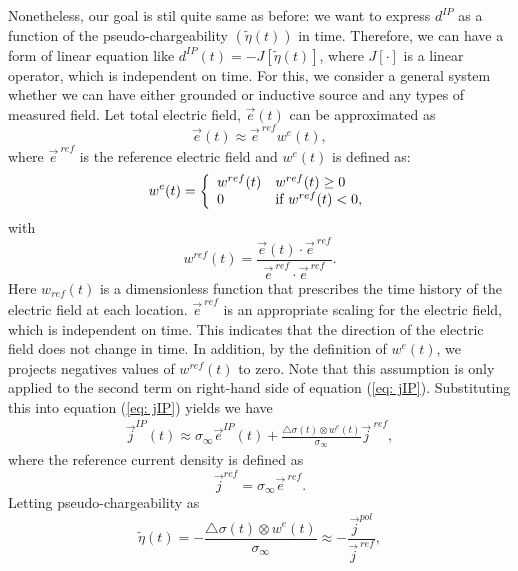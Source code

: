 \documentclass[a4paper, 11pt]{article}
\newcommand{\siginf}{\sigma_\infty}
\newcommand{\dsig}{\triangle\sigma}
\renewcommand {\j}  { {\vec j} }
\newcommand {\e}  { {\vec e} }
\newcommand{\peta}{\tilde{\eta}}
\newcommand{\dip}{d^{IP}}
\begin{document}
Nonetheless, our goal is stil quite same as before: we want to express $d^{IP}$ as a function of the pseudo-chargeability $(\peta(t))$ in time. Therefore, we can have a form of linear equation like $\dip(t) = -J[\peta(t)]$, where $J[\cdot]$ is a linear operator, which is independent on time. For this, we consider a general system whether we can have either grounded or inductive source and any types of measured field. Let total electric field, $\e(t)$ can be approximated as
\begin{equation}
  \e(t) \approx \e^{\ ref}w^e(t),
  \label{eq: e_with_eref}
\end{equation}
where $\e^{\ ref}$ is the reference electric field and $w^e(t)$ is defined as:
\begin{equation}
  w^e(t) = \left\{ 
  \begin{array}{l l}
    w^{ref}(t) & w^{ref}(t) \ge 0 \\
    0 & \text{if } w^{ref}(t) < 0, 
  \end{array}\right.
  \label{eq: we}
\end{equation}
with
\begin{equation}
  w^{ref}(t) = \frac{\e(t)\cdot\e^{\ ref}}{\e^{\ ref}\cdot\e^{\ ref}}.
\end{equation}
Here $w_{ref}(t)$ is a dimensionless function that prescribes the time history of the electric field at each location. $\e^{\ ref}$ is an appropriate scaling for the electric field, which is independent on time. 
This indicates that the direction of the electric field does not change in time. 
In addition, by the definition of $w^e(t)$, we projects negatives values of  $w^{ref}(t)$ to zero.
Note that this assumption is only applied to the second term on right-hand side of equation (\ref{eq: jIP}). 
Substituting this into equation (\ref{eq: jIP}) yields
we have
\begin{eqnarray*}
  \j^{IP}(t) \approx \siginf\e^{IP}(t) + \frac{\dsig(t)\otimes w^e(t)}{\siginf}\j^{\ ref},
\end{eqnarray*}
where the reference current density is defined as
\begin{equation}
  \j^{ref} = \siginf\e^{\ ref}.
\end{equation}
Letting pseudo-chargeability as
\begin{equation}
    \peta(t) = -\frac{\dsig(t)\otimes w^e(t)}{\siginf} \approx -\frac{\j^{pol}}{\j^{\ ref}},
    \label{eq: pseudochargeability}
\end{equation}
\end{document}
